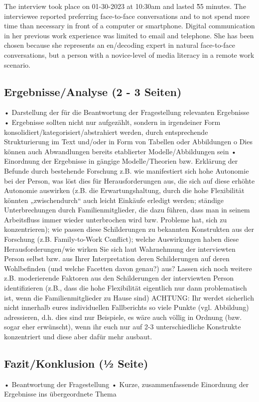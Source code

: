 \documentclass[man]{apa7}
\begin{document}
The interview took place on 01-30-2023 at 10:30am and lasted \~55 minutes. The interviewee reported preferring face-to-face conversations and to not spend more time than necessary in front of a computer or smartphone. Digital communication in her previous work experience was limited to email and telephone. She has been chosen because she represents an en/decoding expert in natural face-to-face conversations, but a person with a novice-level of media literacy in a remote work scenario. 

\subsection{Ergebnisse/Analyse (2 - 3 Seiten)}
• Darstellung der für die Beantwortung der Fragestellung relevanten Ergebnisse
• Ergebnisse sollten nicht nur aufgezählt, sondern in irgendeiner Form
konsolidiert/kategorisiert/abstrahiert werden, durch entsprechende Strukturierung im Text und/oder in Form von Tabellen oder Abbildungen
o Dies können auch Abwandlungen bereits etablierter Modelle/Abbildungen sein
• Einordnung der Ergebnisse in gängige Modelle/Theorien bzw. Erklärung der Befunde durch
bestehende Forschung
z.B. wie manifestiert sich hohe Autonomie bei der Person, was löst dies für Herausforderungen aus, die sich auf diese erhöhte Autonomie auswirken (z.B. die Erwartungshaltung, durch die hohe Flexibilität könnten „zwischendurch“ auch leicht Einkäufe erledigt werden; ständige Unterbrechungen durch Familienmitglieder, die dazu führen, dass man in seinem Arbeitsfluss immer wieder unterbrochen wird bzw. Probleme hat, sich zu konzentrieren); wie passen diese Schilderungen zu bekannten Konstrukten aus der Forschung (z.B. Family-to-Work Conflict); welche Auswirkungen haben diese Herausforderungen/wie wirken Sie sich laut Wahrnehmung der interviewten Person selbst bzw. aus Ihrer Interpretation deren Schilderungen auf deren Wohlbefinden (und welche Facetten davon genau?) aus? Lassen sich noch weitere z.B. moderierende Faktoren aus den Schilderungen der interviewten Person identifizieren (z.B., dass die hohe Flexibilität eigentlich nur dann problematisch ist, wenn die Familienmitglieder zu Hause sind)
ACHTUNG: Ihr werdet sicherlich nicht innerhalb eures individuellen Fallberichts so viele Punkte (vgl. Abbildung) adressieren, d.h. dies sind nur Beispiele, es wäre auch völlig in Ordnung (bzw. sogar eher erwünscht), wenn ihr euch nur auf 2-3 unterschiedliche Konstrukte konzentriert und diese aber dafür mehr ausbaut.

\subsection{Fazit/Konklusion (1⁄2 Seite)}
• Beantwortung der Fragestellung
• Kurze, zusammenfassende Einordnung der Ergebnisse ins übergeordnete Thema

\printbibliography

\appendix
\end{document}
